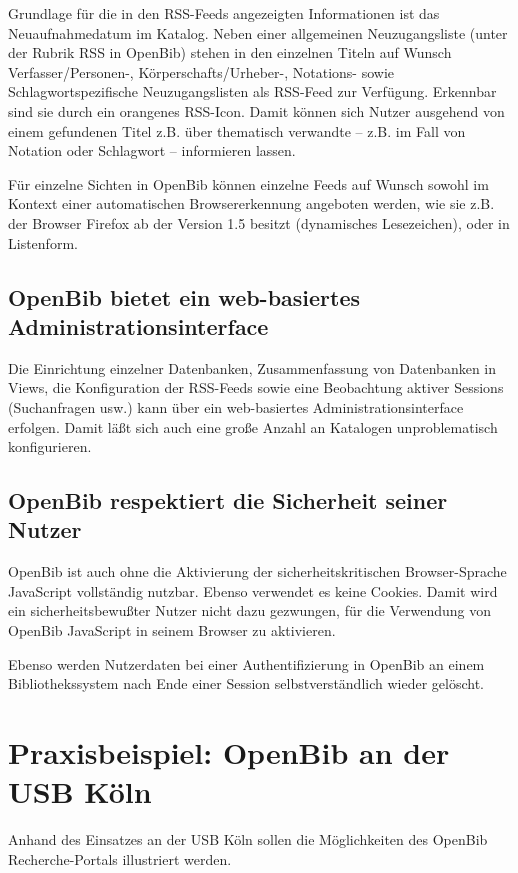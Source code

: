 \documentclass[11pt, twoside, a4paper, BCOR8mm, DIV12, bibtotoc,idxtotoc]{scrbook}
\begin{document}
Grundlage für die in den RSS-Feeds angezeigten Informationen ist das
Neuaufnahmedatum im Katalog. Neben einer allgemeinen Neuzugangsliste
(unter der Rubrik RSS in OpenBib) stehen in den einzelnen Titeln auf
Wunsch Verfasser/Personen-, Körperschafts/Urheber-, Notations- sowie
Schlagwortspezifische Neuzugangslisten als RSS-Feed zur Verfügung.
Erkennbar sind sie durch ein orangenes RSS-Icon. Damit können sich
Nutzer ausgehend von einem gefundenen Titel z.B. über thematisch
verwandte -- z.B. im Fall von Notation oder Schlagwort -- informieren
lassen.

Für einzelne Sichten in OpenBib können einzelne Feeds auf Wunsch
sowohl im Kontext einer automatischen Browsererkennung angeboten
werden, wie sie z.B. der Browser Firefox ab der Version 1.5 besitzt
(dynamisches Lesezeichen), oder in Listenform.

\section{OpenBib bietet ein web-basiertes Administrationsinterface}
Die Einrichtung einzelner Datenbanken, Zusammenfassung von Datenbanken
in Views, die Kon\-fi\-gu\-ra\-tion der RSS-Feeds sowie eine Beobachtung
aktiver Sessions (Suchanfragen usw.) kann über ein web-basiertes
Administrationsinterface erfolgen. Damit läßt sich auch eine große
Anzahl an Katalogen unproblematisch konfigurieren.

\section{OpenBib respektiert die Sicherheit seiner Nutzer}

OpenBib ist auch ohne die Aktivierung der sicherheitskritischen
Browser-Sprache JavaScript vollständig nutzbar. Ebenso verwendet es
keine Cookies. Damit wird ein sicherheitsbewußter Nutzer nicht dazu
gezwungen, für die Verwendung von OpenBib JavaScript in seinem
Browser zu aktivieren.

Ebenso werden Nutzerdaten bei einer Authentifizierung in OpenBib an
einem Bibliothekssystem nach Ende einer Session selbstverständlich
wieder gelöscht.

\chapter{Praxisbeispiel: OpenBib an der USB Köln}
Anhand des Einsatzes an der USB Köln sollen die Möglichkeiten des
OpenBib Recherche-Portals illustriert werden.
\end{document}

